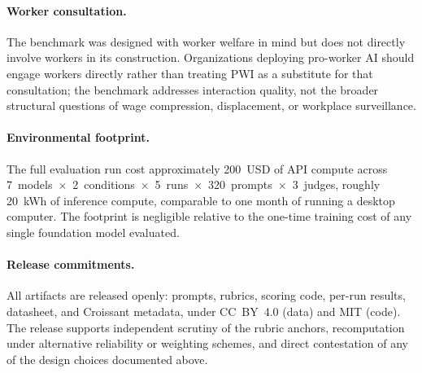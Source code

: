 \documentclass{article}
\begin{document}
\paragraph{Worker consultation.} The benchmark was designed with worker welfare in mind but does not directly involve workers in its construction. Organizations deploying pro-worker AI should engage workers directly rather than treating PWI as a substitute for that consultation; the benchmark addresses interaction quality, not the broader structural questions of wage compression, displacement, or workplace surveillance.

\paragraph{Environmental footprint.} The full evaluation run cost approximately 200~USD of API compute across 7~models~$\times$~2~conditions~$\times$~5~runs~$\times$~320~prompts~$\times$~3~judges, roughly 20~kWh of inference compute, comparable to one month of running a desktop computer. The footprint is negligible relative to the one-time training cost of any single foundation model evaluated.

\paragraph{Release commitments.} All artifacts are released openly: prompts, rubrics, scoring code, per-run results, datasheet, and Croissant metadata, under CC~BY~4.0 (data) and MIT (code). The release supports independent scrutiny of the rubric anchors, recomputation under alternative reliability or weighting schemes, and direct contestation of any of the design choices documented above.


\newpage

\end{document}
